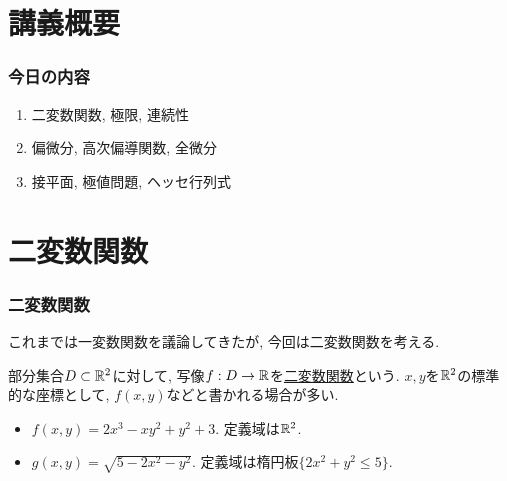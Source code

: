 
\section{講義概要}


\begin{frame}
\frametitle{今日の内容}



\begin{enumerate}
\item 二変数関数, 極限, 連続性
\item 偏微分, 高次偏導関数, 全微分
\item 接平面, 極値問題, ヘッセ行列式
\end{enumerate} 



\end{frame}









\section{二変数関数}


\begin{frame}
\frametitle{二変数関数}


これまでは一変数関数を議論してきたが, 今回は二変数関数を考える. 


\begin{Def}
部分集合$D \subset \mathbb{R}^2$に対して, 写像$f:D\rightarrow \mathbb{R}$を\underline{二変数関数}という. 
$x,y$を$\mathbb{R}^2$の標準的な座標として, $f(x,y)$などと書かれる場合が多い. 
\end{Def}

\begin{itemize}
\item $f(x,y)=2x^3-xy^2+y^2+3$. 定義域は$\mathbb{R}^2$. 
\item $g(x,y)=\sqrt{5-2x^2-y^2}$. 定義域は楕円板$\{2x^2+y^2 \le 5\}$. 

\end{itemize}


\end{frame}



